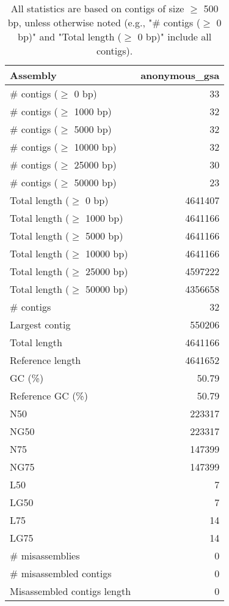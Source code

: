 \documentclass[12pt,a4paper]{article}
\begin{document}
\begin{table}[ht]
\begin{center}
\caption{All statistics are based on contigs of size $\geq$ 500 bp, unless otherwise noted (e.g., "\# contigs ($\geq$ 0 bp)" and "Total length ($\geq$ 0 bp)" include all contigs).}
\begin{tabular}{|l*{1}{|r}|}
\hline
Assembly & anonymous\_gsa \\ \hline
\# contigs ($\geq$ 0 bp) & 33 \\ \hline
\# contigs ($\geq$ 1000 bp) & 32 \\ \hline
\# contigs ($\geq$ 5000 bp) & 32 \\ \hline
\# contigs ($\geq$ 10000 bp) & 32 \\ \hline
\# contigs ($\geq$ 25000 bp) & 30 \\ \hline
\# contigs ($\geq$ 50000 bp) & 23 \\ \hline
Total length ($\geq$ 0 bp) & 4641407 \\ \hline
Total length ($\geq$ 1000 bp) & 4641166 \\ \hline
Total length ($\geq$ 5000 bp) & 4641166 \\ \hline
Total length ($\geq$ 10000 bp) & 4641166 \\ \hline
Total length ($\geq$ 25000 bp) & 4597222 \\ \hline
Total length ($\geq$ 50000 bp) & 4356658 \\ \hline
\# contigs & 32 \\ \hline
Largest contig & 550206 \\ \hline
Total length & 4641166 \\ \hline
Reference length & 4641652 \\ \hline
GC (\%) & 50.79 \\ \hline
Reference GC (\%) & 50.79 \\ \hline
N50 & 223317 \\ \hline
NG50 & 223317 \\ \hline
N75 & 147399 \\ \hline
NG75 & 147399 \\ \hline
L50 & 7 \\ \hline
LG50 & 7 \\ \hline
L75 & 14 \\ \hline
LG75 & 14 \\ \hline
\# misassemblies & 0 \\ \hline
\# misassembled contigs & 0 \\ \hline
Misassembled contigs length & 0 \\ \hline

\end{tabular}
\end{center}
\end{table}
\end{document}
